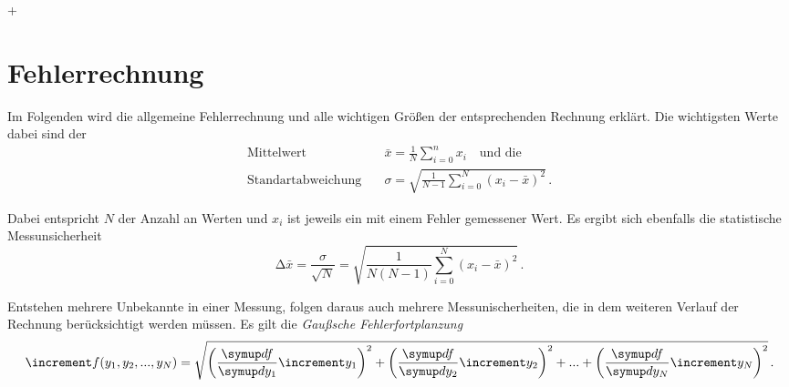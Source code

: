 +\section{Fehlerrechnung}
\label{sec:Fehlerrechnung}

Im Folgenden wird die allgemeine Fehlerrechnung und alle wichtigen Größen der entsprechenden Rechnung erklärt.
Die wichtigsten Werte dabei sind der 
\begin{align}
    \text{Mittelwert} \quad & \bar{x}  = \frac{1}{N} \sum_{i=0}^{n} x_i \quad \text{und die} \label{eq:mittelwert} \\
    \text{Standartabweichung} \quad & \sigma  = \sqrt{\frac{1}{N - 1 } \sum_{i=0}^{N} (x_i -  \bar{x})^2} \, . \label{eq:standartabweichung}
\end{align}

Dabei entspricht $N$ der Anzahl an Werten und $x_i$ ist jeweils ein mit einem Fehler gemessener Wert.
Es ergibt sich ebenfalls die statistische Messunsicherheit
\begin{equation}
    \increment \bar{x} = \frac{\sigma}{\sqrt{N}} = 
    \sqrt{\frac{1}{N(N - 1)} \sum_{i=0}^{N} (x_i -  \bar{x})^2} \, . \label{eq:messunsicherheit}
\end{equation} 

Entstehen mehrere Unbekannte in einer Messung, folgen daraus auch mehrere Messunischerheiten,
die in dem weiteren Verlauf der Rechnung berücksichtigt werden müssen.
Es gilt die \textit{Gaußsche Fehlerfortplanzung}
\begin{equation}
    \increment f(y_1 ,y_2 ,...,y_N ) = \sqrt{\left(\frac{\dif{f}}{\dif{y_{1}}} \increment y_{1}\right)^2
    + \left(\frac{\dif{f}}{\dif{y_{2}}} \increment y_{2}\right)^2 + ... + 
    \left(\frac{\dif{f}}{\dif{y_{N}}} \increment y_{N}\right)^2
    } \, . \label{eq:fehlerfortplanzung}
\end{equation}